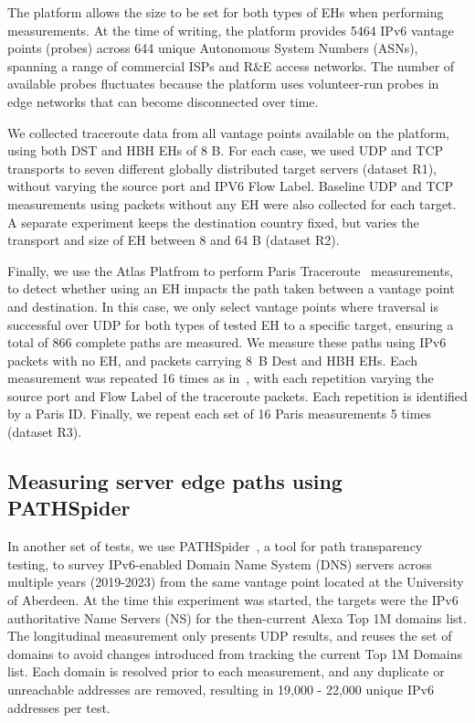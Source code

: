\documentclass[conference]{IEEEtran}
\begin{document}
The platform allows the size to be set for both types of EHs when performing measurements. At the time of writing, the platform provides 5464 IPv6 vantage points (probes) across 644 unique Autonomous System Numbers (ASNs), spanning a range of commercial ISPs and R\&E access networks. The number of available probes fluctuates because the platform uses volunteer-run probes in edge networks that can become disconnected over time.

We collected traceroute data from all vantage points available on the platform, using both DST and HBH EHs of 8 B. For each case, we used  UDP and TCP transports to seven different globally distributed target servers (dataset R1), without varying the source port and IPV6 Flow Label. Baseline UDP and TCP measurements using packets without any EH were also collected for each target.
A separate experiment keeps the destination country fixed, but varies the transport and size of EH between 8 and 64 B (dataset R2).

Finally, we use the Atlas Platfrom to perform Paris Traceroute~\cite{augustin2006avoiding} measurements, to detect whether using an EH impacts the path taken between a vantage point and destination. In this case, we only select vantage points where traversal is successful over UDP for both types of tested EH to a specific target, ensuring a total of 866 complete paths are measured.
We measure these paths using IPv6 packets with no EH, and packets carrying 8~B Dest and HBH EHs. Each measurement was repeated 16 times as in~\cite{augustin2006avoiding}, with each repetition varying the source port and Flow Label of the traceroute packets. Each repetition is identified by a Paris ID. Finally, we repeat each set of 16 Paris measurements 5 times (dataset R3).


    \subsection{Measuring server edge paths using PATHSpider}
    \label{sec:pathspider-methodology}

In another set of tests, we use PATHSpider~\cite{learmonth2016pathspider}, a tool for path transparency testing, to survey IPv6-enabled Domain Name System (DNS) servers across multiple years (2019-2023) from the same vantage point located at the University of Aberdeen. 
At the time this experiment was started, the targets were the IPv6 authoritative Name Servers (NS) for the then-current Alexa Top 1M domains list. 
The longitudinal measurement only presents UDP results, and reuses the set of domains to avoid changes introduced from tracking the current Top 1M Domains list. 
Each domain is resolved prior to each measurement, and any duplicate or unreachable addresses are removed, resulting in 19,000 - 22,000 unique IPv6 addresses per test.
\end{document}
